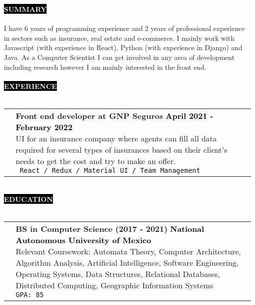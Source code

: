 \documentclass[11pt,A4]{article}
\makeatletter
\newcounter{a}
\newcounter{b}
\newcounter{c}
\newcommand{\cvsection}[1] {
	\textcolor{white}{\MakeUppercase{\textbf{#1}}}
}
\newcommand{\cvsect}[1]{
	\colorbox{black}{{\cvsection{#1}}}\\\\%
}
\newenvironment{entrylist}{%
	\begin{tabular*}{\textwidth}[t]{@{\extracolsep{\fill}}ll}
	}{%
	\end{tabular*}
}
\newcommand{\entry}[5]{%
	&\parbox[t]{17.5cm}{%
		\large\textbf{#1}%
		\hfill
		{\small \textbf{\textcolor{black}{#2}}}\\%
		\normalsize #4\\
		\texttt{#5}
	}\\\\}
\newcommand{\slashsep}{
	\hspace{2mm}/\hspace{2mm}
}
\makeatother
\begin{document}
	\cvsect{Summary}
	I have 6 years of programming experience and 2 years of professional experience in sectors such as insurance, real estate and e-commerce. I mainly work with Javascript (with experience in React), Python (with experience in Django) and Java. As a Computer Scientist I can get involved in any area of development including research however I am mainly interested in the front end. \\
	\\
	\cvsect{Experience}
	\begin{entrylist}
		\entry
		{Front end developer at GNP Seguros}
		{April 2021 - February 2022}
		{GNP Seguros}
		{UI for an insurance company where agents can fill all data required for several types of insurances based on their client's needs to get the cost and try to make an offer.}
		{ React \slashsep Redux \slashsep Material UI \slashsep Team Management}
		\entry
		{Full stack developer at M22}
		{October 2020 - February 2021}
		{M22}
		{UI for a real estate company where people can view details and availability of several places for make purchase agreement. All the data updates in real time and the content is modified from a Content Management System(CMS).}
		{React \slashsep Strapi JS \slashsep QGIS \slashsep GraphQL \slashsep PostgreSQL}
		\entry
		{Full stack developer at Ultra maratón sierra mixe}
		{January 2020 - September 2020}
		{Ultra maratón sierra mixe}
		{This is a client's project on the automation of the processes involved in the realization of a marathon race such as registration, marketing and payment.}
		{React \slashsep Google Firebase \slashsep Bootstrap}
		\entry
		{Full stack developer}
		{Summer 2018}
		{Copnap}
		{Mobile application for Android to help teachers and students to know if a number is prime or not, also the app can give you the list of prime numbers in a range and calculate the Euler's totient function.}
		{Android Studio \slashsep Flutter \slashsep Dart}
	\end{entrylist}
	\\
	\cvsect{Education}
	\begin{entrylist}
		\entry
		{BS in Computer Science (\small 2017 - 2021)}
		{National Autonomous University of Mexico }
		{UNAM, Faculty of Science}
		{Relevant Coursework: Automata Theory, Computer Architecture, Algorithm Analysis, Artificial Intelligence, Software Engineering, Operating Systems, Data Structures, Relational Databases, Distributed Computing, Geographic Information Systems} 
		{GPA: 85}
	\end{entrylist}
	\\
\end{document}
